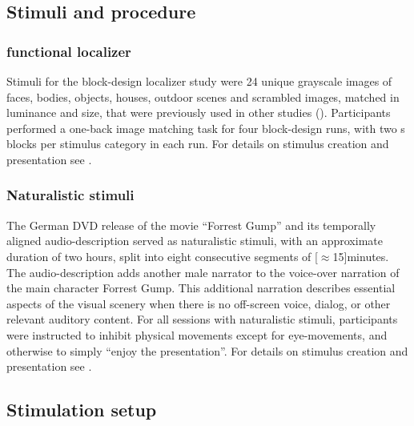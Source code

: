 \subsection{Stimuli and procedure}


\subsubsection{functional localizer}

Stimuli for the block-design localizer study were 24 unique grayscale images of
faces, bodies, objects, houses, outdoor scenes and scrambled images, matched in
luminance and size, that were previously used in other studies
(\citep[e.g.,][]{haxby2011common}).
Participants performed a one-back image matching task for four block-design
runs, with two \unit[16]{s} blocks per stimulus category in each run.
%
For details on stimulus creation and presentation see
\citet{sengupta2016extension}.


\subsubsection{Naturalistic stimuli}
The German DVD release \citep{ForrestGumpDVD} of the movie ``Forrest Gump''
\citep{ForrestGumpMovie} and its temporally aligned audio-description
\citep{ForrestGumpGermanAD} served as naturalistic stimuli, with an approximate
duration of two hours, split into eight consecutive segments of
\unit[$\approx$15]{minutes}.
The audio-description adds another male narrator to the voice-over narration of
the main character Forrest Gump. This additional narration describes essential
aspects of the visual scenery when there is no off-screen voice, dialog, or
other relevant auditory content.
For all sessions with naturalistic stimuli, participants were instructed to
inhibit physical movements except for eye-movements, and otherwise to simply
``enjoy the presentation''.
%
For details on stimulus creation and presentation see
\citet{hanke2014audiomovie, hanke2016simultaneous}.


\subsection{Stimulation setup}

